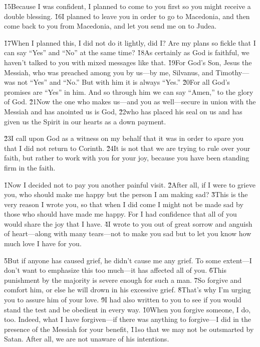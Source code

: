 \v{15}Because I was confident, I planned to come to you first so you might receive a double blessing. \v{16}I planned to leave you in order to go to Macedonia, and then come back to you from Macedonia, and let you send me on to Judea.

\v{17}When I planned this, I did not do it lightly, did I? Are my plans so fickle that I can say ``Yes'' and ``No'' at the same time? \v{18}As certainly as God is faithful, we haven't talked to you with mixed messages like that. \v{19}For God's Son, Jesus the Messiah, who was preached among you by us---by me, Silvanus, and Timothy---was not ``Yes'' and ``No.'' But with him it is always ``Yes.'' \v{20}For all God's promises are ``Yes'' in him. And so through him we can say ``Amen,'' to the glory of God. \v{21}Now the one who makes us---and you as well---secure in union with the Messiah and has anointed us is God, \v{22}who has placed his seal on us and has given us the Spirit in our hearts as a down payment.

\v{23}I call upon God as a witness on my behalf that it was in order to spare you that I did not return to Corinth. \v{24}It is not that we are trying to rule over your faith, but rather to work with you for your joy, because you have been standing firm in the faith.

\v{1}Now I decided not to pay you another painful visit. \v{2}After all, if I were to grieve you, who should make me happy but the person I am making sad? \v{3}This is the very reason I wrote you, so that when I did come I might not be made sad by those who should have made me happy. For I had confidence that all of you would share the joy that I have. \v{4}I wrote to you out of great sorrow and anguish of heart---along with many tears---not to make you sad but to let you know how much love I have for you.

\v{5}But if anyone has caused grief, he didn't cause me any grief. To some extent---I don't want to emphasize this too much---it has affected all of you. \v{6}This punishment by the majority is severe enough for such a man. \v{7}So forgive and comfort him, or else he will drown in his excessive grief. \v{8}That's why I'm urging you to assure him of your love. \v{9}I had also written to you to see if you would stand the test and be obedient in every way. \v{10}When you forgive someone, I do, too. Indeed, what I have forgiven---if there was anything to forgive---I did in the presence of the Messiah for your benefit, \v{11}so that we may not be outsmarted by Satan. After all, we are not unaware of his intentions.

